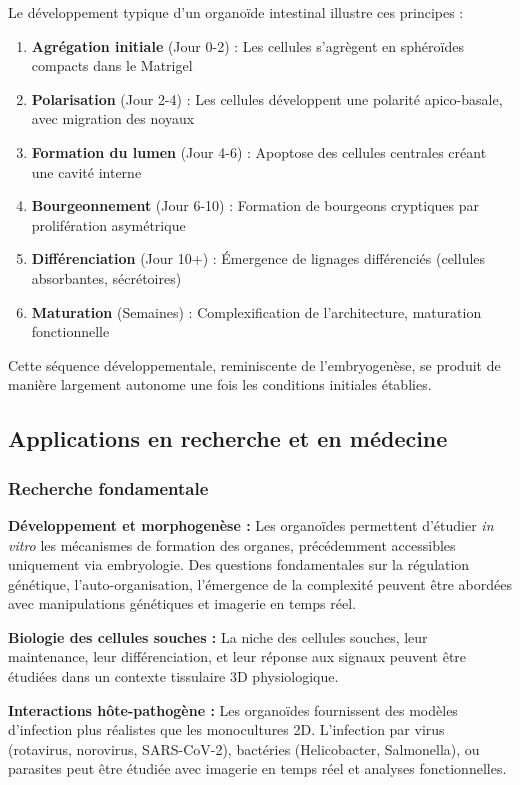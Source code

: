 Le développement typique d'un organoïde intestinal illustre ces principes :
\begin{enumerate}
    \item \textbf{Agrégation initiale} (Jour 0-2) : Les cellules s'agrègent en sphéroïdes compacts dans le Matrigel
    \item \textbf{Polarisation} (Jour 2-4) : Les cellules développent une polarité apico-basale, avec migration des noyaux
    \item \textbf{Formation du lumen} (Jour 4-6) : Apoptose des cellules centrales créant une cavité interne
    \item \textbf{Bourgeonnement} (Jour 6-10) : Formation de bourgeons cryptiques par prolifération asymétrique
    \item \textbf{Différenciation} (Jour 10+) : Émergence de lignages différenciés (cellules absorbantes, sécrétoires)
    \item \textbf{Maturation} (Semaines) : Complexification de l'architecture, maturation fonctionnelle
\end{enumerate}

Cette séquence développementale, reminiscente de l'embryogenèse, se produit de manière largement autonome une fois les conditions initiales établies.

\subsection{Applications en recherche et en médecine}

\subsubsection{Recherche fondamentale}

\textbf{Développement et morphogenèse :}
Les organoïdes permettent d'étudier \textit{in vitro} les mécanismes de formation des organes, précédemment accessibles uniquement via embryologie. Des questions fondamentales sur la régulation génétique, l'auto-organisation, l'émergence de la complexité peuvent être abordées avec manipulations génétiques et imagerie en temps réel.

\textbf{Biologie des cellules souches :}
La niche des cellules souches, leur maintenance, leur différenciation, et leur réponse aux signaux peuvent être étudiées dans un contexte tissulaire 3D physiologique.

\textbf{Interactions hôte-pathogène :}
Les organoïdes fournissent des modèles d'infection plus réalistes que les monocultures 2D. L'infection par virus (rotavirus, norovirus, SARS-CoV-2), bactéries (Helicobacter, Salmonella), ou parasites peut être étudiée avec imagerie en temps réel et analyses fonctionnelles.


